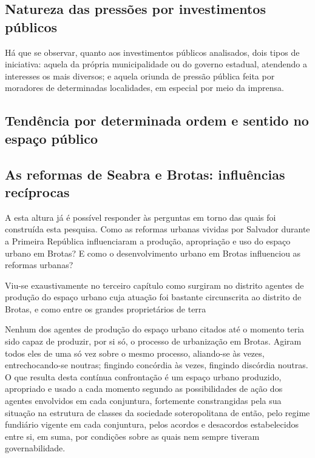 \subsection{Natureza das pressões por investimentos públicos}\label{subsec:3.3.2}

Há que se observar, quanto aos investimentos públicos analisados, dois tipos de iniciativa: aquela da própria municipalidade ou do governo estadual, atendendo a interesses os mais diversos; e aquela oriunda de pressão pública feita por moradores de determinadas localidades, em especial por meio da imprensa.

\subsection{Tendência por determinada ordem e sentido no espaço público}\label{subsec:3.3.3}



\subsection[As reformas de Seabra e Brotas: influências recíprocas]{As reformas de Seabra e Brotas: influências recíprocas}\label{subsec:3.3.4}

A esta altura já é possível responder às perguntas em torno das quais foi construída esta pesquisa. Como as reformas urbanas vividas por Salvador durante a Primeira República influenciaram a produção, apropriação e uso do espaço urbano em Brotas? E como o desenvolvimento urbano em Brotas influenciou as reformas urbanas?

Viu-se exaustivamente no terceiro capítulo como surgiram no distrito agentes de produção do espaço urbano cuja atuação foi bastante circunscrita ao distrito de Brotas, e como entre os grandes proprietários de terra

Nenhum dos agentes de produção do espaço urbano citados até o momento teria sido capaz de produzir, por si só, o processo de urbanização em Brotas. Agiram todos eles de uma só vez sobre o mesmo processo, aliando-se às vezes, entrechocando-se noutras; fingindo concórdia às vezes, fingindo discórdia noutras. O que resulta desta contínua confrontação é um espaço urbano produzido, apropriado e usado a cada momento segundo as possibilidades de ação dos agentes envolvidos em cada conjuntura, fortemente constrangidas pela sua situação na estrutura de classes da sociedade soteropolitana de então, pelo regime fundiário vigente em cada conjuntura, pelos acordos e desacordos estabelecidos entre si, em suma, por condições sobre as quais nem sempre tiveram governabilidade.

